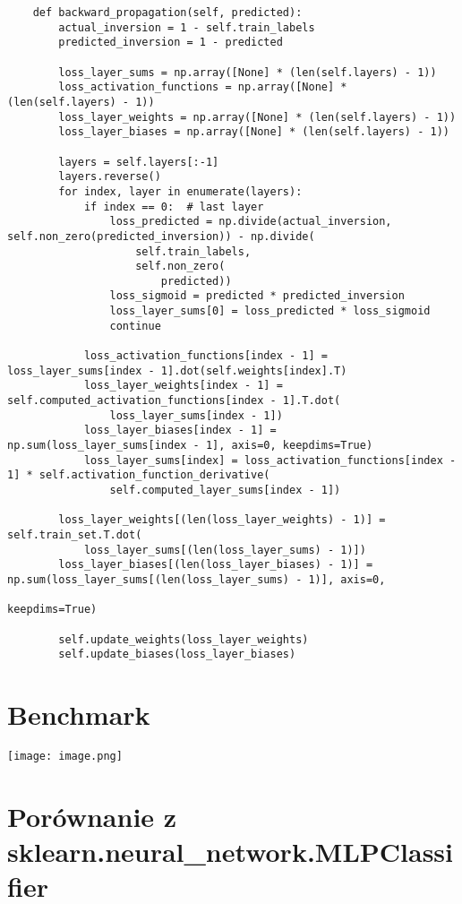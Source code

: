 \documentclass[12pt]{article}
\begin{document}
\noindent
    \begin{verbatim}
    def backward_propagation(self, predicted):
        actual_inversion = 1 - self.train_labels
        predicted_inversion = 1 - predicted

        loss_layer_sums = np.array([None] * (len(self.layers) - 1))
        loss_activation_functions = np.array([None] * (len(self.layers) - 1))
        loss_layer_weights = np.array([None] * (len(self.layers) - 1))
        loss_layer_biases = np.array([None] * (len(self.layers) - 1))

        layers = self.layers[:-1]
        layers.reverse()
        for index, layer in enumerate(layers):
            if index == 0:  # last layer
                loss_predicted = np.divide(actual_inversion, self.non_zero(predicted_inversion)) - np.divide(
                    self.train_labels,
                    self.non_zero(
                        predicted))
                loss_sigmoid = predicted * predicted_inversion
                loss_layer_sums[0] = loss_predicted * loss_sigmoid
                continue

            loss_activation_functions[index - 1] = loss_layer_sums[index - 1].dot(self.weights[index].T)
            loss_layer_weights[index - 1] = self.computed_activation_functions[index - 1].T.dot(
                loss_layer_sums[index - 1])
            loss_layer_biases[index - 1] = np.sum(loss_layer_sums[index - 1], axis=0, keepdims=True)
            loss_layer_sums[index] = loss_activation_functions[index - 1] * self.activation_function_derivative(
                self.computed_layer_sums[index - 1])

        loss_layer_weights[(len(loss_layer_weights) - 1)] = self.train_set.T.dot(
            loss_layer_sums[(len(loss_layer_sums) - 1)])
        loss_layer_biases[(len(loss_layer_biases) - 1)] = np.sum(loss_layer_sums[(len(loss_layer_sums) - 1)], axis=0,
                                                                 keepdims=True)

        self.update_weights(loss_layer_weights)
        self.update_biases(loss_layer_biases)
    \end{verbatim}

\section{Benchmark}
       \begin{center}
            \texttt{[image: image.png]}
        \end{center}
\section{Porównanie z sklearn.neural\_network.MLPClassifier}

\noindent
\end{document}
